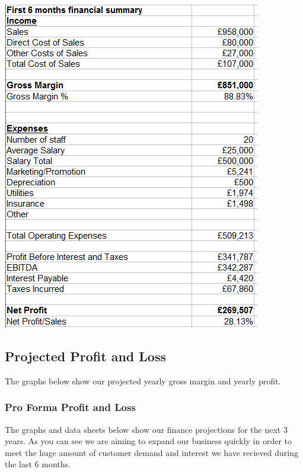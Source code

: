 \documentclass{article}
\begin{document}
\includegraphics[scale=1.0]{firstSixMonths.png}

\subsection{Projected Profit and Loss}

The graphs below show our projected yearly gross margin and yearly profit.

\subsubsection{Pro Forma Profit and Loss}

The graphs and data sheets below show our finance projections for the next 3 years. As you can see we are aiming to expand our business quickly in order to meet the huge amount of customer demand and interest we have recieved during the last 6 months.
\end{document}
